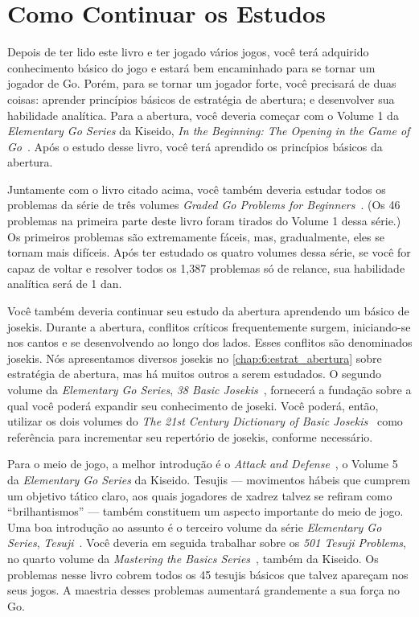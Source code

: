 \chapter{Como Continuar os Estudos}

Depois de ter lido este livro e ter jogado vários jogos, você terá adquirido conhecimento básico do jogo e estará bem encaminhado para se tornar um jogador de Go. Porém, para se tornar um jogador forte, você precisará de duas coisas: aprender princípios básicos de estratégia de abertura; e desenvolver sua habilidade analítica. Para a abertura, você deveria começar com o Volume 1 da \emph{Elementary Go Series} da Kiseido, \emph{In the Beginning: The Opening in the Game of Go}~\cite{ikure_in_the_beginning}. Após o estudo desse livro, você terá aprendido os princípios básicos da abertura.

Juntamente com o livro citado acima, você também deveria estudar todos os problemas da série de três volumes \emph{Graded Go Problems for Beginners}~\cite{yoshinori_bozulich_ggpb}. (Os 46 problemas na primeira parte deste livro foram tirados do Volume 1 dessa série.) Os primeiros problemas são extremamente fáceis, mas, gradualmente, eles se tornam mais difíceis. Após ter estudado os quatro volumes dessa série, se você for capaz de voltar e resolver todos os 1,387 problemas só de relance, sua habilidade analítica será de 1 dan.

Você também deveria continuar seu estudo da abertura aprendendo um básico de josekis. Durante a abertura, conflitos críticos frequentemente surgem, iniciando-se nos cantos e se desenvolvendo ao longo dos lados. Esses conflitos são denominados josekis. Nós apresentamos diversos josekis no \autoref{chap:6:estrat_abertura} sobre estratégia de abertura, mas há muitos outros a serem estudados. O segundo volume da \emph{Elementary Go Series}, \emph{38 Basic Josekis}~\cite{ishida_yoshio_basic_joseki_dictionary}, fornecerá a fundação sobre a qual você poderá expandir seu conhecimento de joseki. Você poderá, então, utilizar os dois volumes do \emph{The 21st Century Dictionary of Basic Josekis}~\cite{takao_shinji_21st_century_joseki_dictionary} como referência para incrementar seu repertório de josekis, conforme necessário.

Para o meio de jogo, a melhor introdução é o \emph{Attack and Defense}~\cite{ishida_akira_james_davies}, o Volume 5 da \emph{Elementary Go Series} da Kiseido. Tesujis --- movimentos hábeis que cumprem um objetivo tático claro, aos quais jogadores de xadrez talvez se refiram como ``brilhantismos'' --- também constituem um aspecto importante do meio de jogo. Uma boa introdução ao assunto é o terceiro volume da série \emph{Elementary Go Series}, \emph{Tesuji}~\cite{davies_tesuji}. Você deveria em seguida trabalhar sobre os \emph{501 Tesuji Problems}, no quarto volume da \emph{Mastering the Basics Series}~\cite{bozulich_501_tesuji}, também da Kiseido. Os problemas nesse livro cobrem todos os 45 tesujis básicos que talvez apareçam nos seus jogos. A maestria desses problemas aumentará grandemente a sua força no Go.

